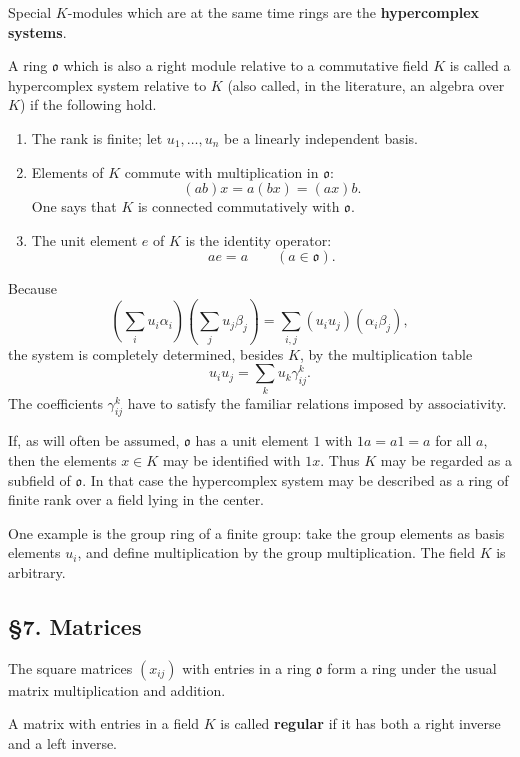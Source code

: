 \documentclass[11pt]{article}
\begin{document}
Special \(K\)-modules which are at the same time rings are the
\textbf{hypercomplex systems}.

A ring \(\mathfrak{o}\) which is also a right module relative to a
commutative field \(K\) is called a hypercomplex system relative to
\(K\) (also called, in the literature, an algebra over \(K\)) if the
following hold.

\begin{enumerate}
\def\labelenumi{\arabic{enumi}.}
\item
  The rank is finite; let \(u_1,\ldots,u_n\) be a linearly independent
  basis.
\item
  Elements of \(K\) commute with multiplication in \(\mathfrak{o}\): \[
    (ab)x=a(bx)=(ax)b.
  \] One says that \(K\) is connected commutatively with
  \(\mathfrak{o}\).
\item
  The unit element \(e\) of \(K\) is the identity operator: \[
    ae=a \qquad (a\in\mathfrak{o}).
  \]
\end{enumerate}

Because \[
  \left(\sum_i u_i\alpha_i\right)
  \left(\sum_j u_j\beta_j\right)
  =\sum_{i,j} (u_i u_j)(\alpha_i\beta_j),
\] the system is completely determined, besides \(K\), by the
multiplication table \[
  u_i u_j=\sum_k u_k\gamma_{ij}^{k}.
\] The coefficients \(\gamma_{ij}^{k}\) have to satisfy the familiar
relations imposed by associativity.

If, as will often be assumed, \(\mathfrak{o}\) has a unit element \(1\)
with \(1a=a1=a\) for all \(a\), then the elements \(x\in K\) may be
identified with \(1x\). Thus \(K\) may be regarded as a subfield of
\(\mathfrak{o}\). In that case the hypercomplex system may be described
as a ring of finite rank over a field lying in the center.

One example is the group ring of a finite group: take the group elements
as basis elements \(u_i\), and define multiplication by the group
multiplication. The field \(K\) is arbitrary.

\subsection{§7. Matrices}\label{matrices}

The square matrices \((x_{ij})\) with entries in a ring \(\mathfrak{o}\)
form a ring under the usual matrix multiplication and addition.

A matrix with entries in a field \(K\) is called \textbf{regular} if it
has both a right inverse and a left inverse.
\end{document}
